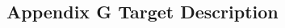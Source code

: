 \documentclass[class=book, crop=false]{standalone}
\begin{document}
\begin{CJK}{UTF8}{gbsn}

\chapter*{Appendix G Target Description}













\cleardoublepage

\end{CJK}
\end{document}
